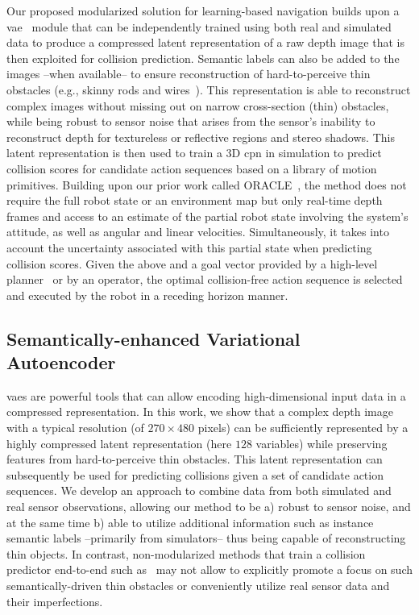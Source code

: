 Our proposed modularized solution for learning-based navigation builds upon a \ac{vae}~\cite{doersch2016tutorial,kingma2013auto} module that can be independently trained using both real and simulated data to produce a compressed latent representation of a raw depth image that is then exploited for collision prediction. Semantic labels can also be added to the images --when available-- to ensure reconstruction of hard-to-perceive thin obstacles (e.g., skinny rods and wires~\cite{Kulkarni2020}). This representation is able to reconstruct complex images without missing out on narrow cross-section (thin) obstacles, while being robust to sensor noise that arises from the sensor's inability to reconstruct depth for textureless or reflective regions and stereo shadows. This latent representation is then used to train a $3$D \ac{cpn} in simulation to predict collision scores for candidate action sequences based on a library of motion primitives. Building upon our prior work called ORACLE~\cite{ORACLE_ICRA2022}, the method does not require the full robot state or an environment map but only real-time depth frames and access to an estimate of the partial robot state involving the system's attitude, as well as angular and linear velocities. Simultaneously, it takes into account the uncertainty associated with this partial state when predicting collision scores. Given the above and a goal vector provided by a high-level planner~\cite{GBPLANNER_JFR_2020,achtelik2014motion} or by an operator, the optimal collision-free action sequence is selected and executed by the robot in a receding horizon manner.


\subsection{Semantically-enhanced Variational Autoencoder}\label{sec:vae}
\ac{vae}s are powerful tools that can allow encoding high-dimensional input data in a compressed representation. In this work, we show that a complex depth image with a typical resolution (of $270\times 480$ pixels) can be sufficiently represented by a highly compressed latent representation (here $128$ variables) while preserving features from hard-to-perceive thin obstacles. This latent representation can subsequently be used for predicting collisions given a set of candidate action sequences. We develop an approach to combine data from both simulated and real sensor observations, allowing our method to be a) robust to sensor noise, and at the same time b) able to utilize additional information such as instance semantic labels --primarily from simulators-- thus being capable of reconstructing thin objects. In contrast, non-modularized methods that train a collision predictor end-to-end such as~\cite{ORACLE_ICRA2022} may not allow to explicitly promote a focus on such semantically-driven thin obstacles or conveniently utilize real sensor data and their imperfections.

